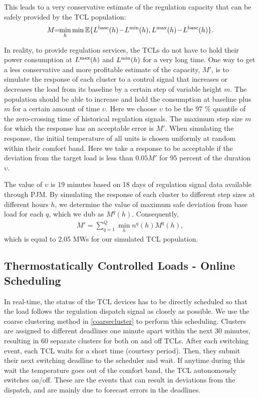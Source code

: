 \documentclass[10pt]{IEEEtran}
\begin{document}
This leads to a very conservative estimate of the regulation capacity that can be safely provided by the TCL population:
\begin{eqnarray}
M \!\!=\!\! \min_h \min{\mathbb E}\{L^{\rm base}(h) \!-\! L^{\rm min}(h),  L^{\rm max}(h) \!-\!  L^{\rm base}(h)\}.
\end{eqnarray}


In reality, to provide regulation services, the TCLs do not have to hold their power consumption at $L^{\rm max}(h)$ and $L^{\rm min}(h)$ for a very long time. One way to get a less conservative and more profitable estimate of the capacity, $M'$, is to simulate the response of each cluster to a control signal that increases or decreases the load from its baseline by a certain step of variable height $m$. The population should be able to increase and hold the consumption at baseline plus $m$ for a certain amount of time $\upsilon$. Here we choose $\upsilon$ to be the 97 $\%$ quantile of the zero-crossing time of historical regulation signals. The maximum step size $m$ for which the response has an acceptable error is $M'$. When simulating the response, the initial temperature of all units is chosen uniformly at random within their comfort band. Here we take a response to be acceptable if the deviation from the target load is less than $0.05 M'$ for 95 percent of the duration $\upsilon$. 


 The value of $\upsilon$ is  19 minutes based on 18 days of regulation signal  data available through PJM. By simulating the response of each cluster to different step sizes at different hours $h$, we determine the value of maximum safe deviation from base load for each $q$, which we dub as $M^q(h)$. Consequently,
\begin{eqnarray}
M' =  \sum_{q=1}^Q  \min_{h}n^q(h) M^q(h),
\end{eqnarray}
which is equal to 2.05 MWs for our simulated TCL population.



\subsection{Thermostatically Controlled Loads - Online Scheduling}\label{sec.TCLonline}

 
 In real-time, the status of the TCL devices has to be directly scheduled so that the load follows the regulation dispatch signal as closely as possible. We use the coarse clustering method in \eqref{coarsecluster} to perform this scheduling. Clusters are assigned to different deadlines one minute apart within the next 30 minutes, resulting in 60 separate clusters for both on and off TCLs. After each switching event, each TCL waits for a short time (courtesy period). Then, they submit their next switching deadline to the scheduler and wait. If anytime during this wait the temperature goes out of the comfort band, the TCL autonomously switches on/off. These are the events that can result in deviations from the dispatch, and are mainly due to forecast errors in the deadlines.
\end{document}
